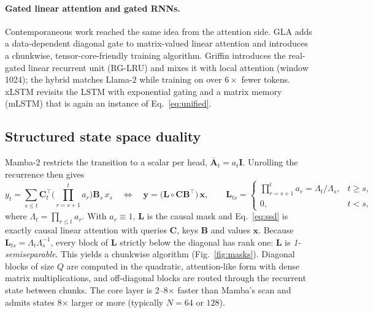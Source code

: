 \documentclass[a4paper]{article}
\newcommand{\T}{^{\top}}
\newcommand{\vx}{\mathbf{x}}
\newcommand{\vy}{\mathbf{y}}
\newcommand{\mB}{\mathbf{B}}
\newcommand{\mC}{\mathbf{C}}
\newcommand{\mI}{\mathbf{I}}
\newcommand{\mL}{\mathbf{L}}
\newcommand{\Ab}{\overline{\mathbf{A}}}
\theoremstyle{plain}
\theoremstyle{remark}
\begin{document}
\paragraph{Gated linear attention and gated RNNs.} Contemporaneous work reached the same idea from the attention side. GLA \citep{yang2024gla} adds a data-dependent diagonal gate to matrix-valued linear attention and introduces a chunkwise, tensor-core-friendly training algorithm. Griffin \citep{de2024griffin} introduces the real-gated linear recurrent unit (RG-LRU) and mixes it with local attention (window 1024); the hybrid matches Llama-2 while training on over $6\times$ fewer tokens. xLSTM \citep{beck2024xlstm} revisits the LSTM with exponential gating and a matrix memory (mLSTM) that is again an instance of Eq.~\eqref{eq:unified}.

\subsection{Structured state space duality}
\label{sec:ssd}
Mamba-2 \citep{dao2024ssd} restricts the transition to a scalar per head, $\Ab_t=a_t\mI$. Unrolling the recurrence then gives
\begin{equation}
\label{eq:ssd}
y_t=\sum_{s\le t}\mC_t\T\Big(\prod_{r=s+1}^{t}a_r\Big)\mB_s\,x_s
\quad\Longleftrightarrow\quad
\vy=\big(\mL\circ\mC\mB\T\big)\,\vx,\qquad
\mL_{ts}=\begin{cases}\prod_{r=s+1}^{t}a_r=\Lambda_t/\Lambda_s,& t\ge s,\\ 0,& t<s,\end{cases}
\end{equation}
where $\Lambda_t=\prod_{r\le t}a_r$. With $a_r\equiv1$, $\mL$ is the causal mask and Eq.~\eqref{eq:ssd} is exactly causal linear attention with queries $\mC$, keys $\mB$ and values $\vx$. Because $\mL_{ts}=\Lambda_t\Lambda_s^{-1}$, every block of $\mL$ strictly below the diagonal has rank one: $\mL$ is \emph{1-semiseparable}. This yields a chunkwise algorithm (Fig.~\ref{fig:masks}). Diagonal blocks of size $Q$ are computed in the quadratic, attention-like form with dense matrix multiplications, and off-diagonal blocks are routed through the recurrent state between chunks. The core layer is 2--8$\times$ faster than Mamba's scan and admits states 8$\times$ larger or more (typically $N{=}64$ or $128$).
\end{document}
